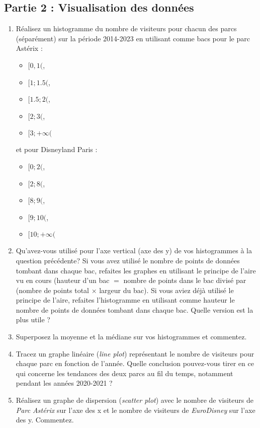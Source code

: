 \documentclass[a4paper,11pt]{article}
\begin{document}
\subsection*{Partie 2 : Visualisation des données}
\begin{enumerate}
    \item Réalisez un histogramme du nombre de visiteurs pour chacun des parcs (séparément) sur la période 2014-2023 en utilisant comme bacs pour le parc Astérix :
    \begin{itemize}
        \item $[0, 1($,
        \item $[1; 1.5($,
        \item $[1.5; 2($,
        \item $[2; 3($,
        \item $[3; +\infty($
    \end{itemize}
    et pour Disneyland Paris :
    \begin{itemize}
        \item $[0; 2($,
        \item $[2; 8($,
        \item $[8; 9($,
        \item $[9; 10($,
        \item $[10; +\infty($
    \end{itemize}
    \item Qu'avez-vous utilisé pour l'axe vertical (axe des y) de vos histogrammes à la question précédente? Si vous avez utilisé le nombre de points de données tombant dans chaque bac, refaites les graphes en utilisant le principe de l'aire vu en cours (hauteur d'un bac $=$ nombre de points dans le bac divisé par (nombre de points total $\times$ largeur du bac). Si vous aviez déjà utilisé le principe de l'aire, refaites l'histogramme en utilisant comme hauteur le nombre de points de données tombant dans chaque bac. Quelle version est la plus utile ?
    \item Superposez la moyenne et la médiane sur vos histogrammes et commentez. 
    \item Tracez un graphe linéaire (\textit{line plot}) représentant le nombre de visiteurs pour chaque parc en fonction de l'année. Quelle conclusion pouvez-vous tirer en ce qui concerne les tendances des deux parcs au fil du temps, notamment pendant les années 2020-2021 ?
    \item Réalisez un graphe de dispersion (\textit{scatter plot}) avec le nombre de visiteurs de \textit{Parc Astérix} sur l'axe des x et le nombre de visiteurs de \textit{EuroDisney} sur l'axe des y. Commentez.
\end{enumerate}
\end{document}
